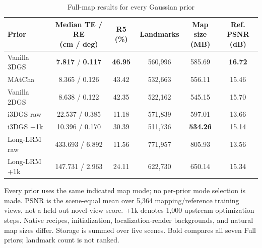 \begin{table}[tp]
\centering
\footnotesize
\setlength{\tabcolsep}{4pt}
\renewcommand{\arraystretch}{1.12}
\caption{Full-map results for every Gaussian prior}
\label{tab:s_prior_full}
\begin{tabular}{lccccc}
\toprule
Prior & \shortstack{Median TE / RE\\(cm / deg)} & R5 (\%) & Landmarks & \shortstack{Map size\\(MB)} & \shortstack{Ref. PSNR\\(dB)} \\
\midrule
Vanilla 3DGS & \textbf{7.817} / \textbf{0.117} & \textbf{46.95} & 560,996 & 585.69 & \textbf{16.72} \\
MAtCha & 8.365 / 0.126 & 43.42 & 532,663 & 556.11 & 15.46 \\
Vanilla 2DGS & 8.638 / 0.122 & 42.35 & 522,162 & 545.15 & 15.70 \\
i3DGS raw & 22.537 / 0.385 & 11.18 & 571,839 & 597.01 & 13.66 \\
i3DGS +1k & 10.396 / 0.170 & 30.39 & 511,736 & \textbf{534.26} & 15.14 \\
Long-LRM raw & 433.693 / 6.892 & 11.56 & 771,957 & 805.93 & 13.56 \\
Long-LRM +1k & 147.731 / 2.963 & 24.11 & 622,730 & 650.14 & 15.34 \\
\bottomrule
\end{tabular}
\par\smallskip\begin{minipage}{0.98\linewidth}\footnotesize Every prior uses the same indicated map mode; no per-prior mode selection is made. PSNR is the scene-equal mean over 5,364 mapping/reference training views, not a held-out novel-view score. +1k denotes 1,000 upstream optimization steps. Native recipes, initialization, localization-render backgrounds, and natural map sizes differ. Storage is summed over five scenes. Bold compares all seven Full priors; landmark count is not ranked.\end{minipage}
\end{table}
